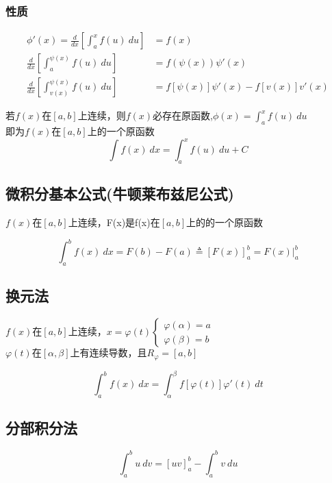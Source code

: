 \subsubsection{性质}
	\begin{align}
		\phi'(x)=\frac{d}{dx}\left[\int_{a}^{x}f(u)\ du\right]&=f(x)\label{integral_upper_limit_function_1}\\
		\frac{d}{dx}\left[\int_{a}^{\psi(x)}f(u)\ du\right]&=f(\psi(x))\psi'(x)\label{integral_upper_limit_function_2}\\
		\frac{d}{dx}\left[\int_{v(x)}^{\psi(x)}f(u)\ du\right]&=f\left[\psi(x)\right]\psi'(x)-f\left[v(x)\right]v'(x)\label{integral_upper_limit_function_3}
	\end{align}
	\begin{center}
			若$f(x)$在$\left[a,b\right]$上连续，则$f(x)$必存在原函数,$\phi(x)=\int_{a}^{x}f(u)\ du$\\
			即为$f(x)$在$\left[a,b\right]$上的一个原函数
			$$\int f(x)\ dx=\int_{a}^{x}f(u)\ du+C$$
	\end{center}
\subsection{微积分基本公式(牛顿莱布兹尼公式)}
	\centerline{$f(x)$在$\left[a,b\right]$上连续，F(x)是f(x)在$\left[a,b\right]$上的的一个原函数}
	\begin{equation}
		\int_{a}^{b}f(x)\ dx=F(b)-F(a) \triangleq \left[F(x)\right]_a^b=\left.F(x)\right|_a^b\label{Leibniz_formula}
	\end{equation}
\subsection{换元法}
	\begin{center}
		$f(x)$在$\left[a,b\right]$上连续，$x=\varphi(t)\begin{cases}
			\varphi(\alpha)=a\\
			\varphi(\beta)=b
		\end{cases}$\\
	$\varphi(t)\mbox{在}\left[\alpha,\beta\right]\mbox{上有连续导数，且}R_\varphi=\left[a,b\right]$
	\end{center}
	\begin{equation}
		\int_{a}^{b}f(x)\ dx=\int_{\alpha}^{\beta}f\left[\varphi(t)\right]\varphi'(t)\ dt\label{Fixed_integral_substitution_method}
	\end{equation}
\subsection{分部积分法}
\begin{equation}
	\int_{a}^{b}u\ dv=\left[uv\right]_a^b-\int_{a}^{b}v\ du
\end{equation}
